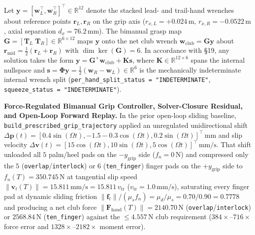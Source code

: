 \documentclass[11pt,a4paper]{article}
\begin{document}
Let $\mathbf{y} = [\mathbf{w}_L^{\top}, \mathbf{w}_R^{\top}]^{\top} \in \mathbb{R}^{12}$ denote the stacked lead- and trail-hand wrenches about reference points $\mathbf{r}_L, \mathbf{r}_R$ on the grip axis ($r_{x,L} = +0.024\,\mathrm{m}$, $r_{x,R} = -0.0522\,\mathrm{m}$, axial separation $d_x = 76.2\,\mathrm{mm}$). The bimanual grasp map $\mathbf{G} = [\mathbf{T}_L\;\mathbf{T}_R] \in \mathbb{R}^{6 \times 12}$ maps $\mathbf{y}$ onto the net club wrench $\mathbf{w}_{\mathrm{club}} = \mathbf{G}\mathbf{y}$ about $\mathbf{r}_{\mathrm{mid}} = \frac{1}{2}(\mathbf{r}_L + \mathbf{r}_R)$ with $\dim\ker(\mathbf{G}) = 6$. In accordance with \S 19, any solution takes the form $\mathbf{y} = \mathbf{G}^{+}\mathbf{w}_{\mathrm{club}} + \mathbf{K}\mathbf{s}$, where $\mathbf{K} \in \mathbb{R}^{12 \times 6}$ spans the internal nullspace and $\mathbf{s} = \boldsymbol{\Phi}\mathbf{y} = \frac{1}{2}(\mathbf{w}_R - \mathbf{w}_L) \in \mathbb{R}^6$ is the mechanically indeterminate internal wrench split (\texttt{per\_hand\_split\_status = "INDETERMINATE"}, \texttt{squeeze\_status = "INDETERMINATE"}).

\textbf{Force-Regulated Bimanual Grip Controller, Solver-Closure Residual, and Open-Loop Forward Replay.}
In the prior open-loop sliding baseline, \texttt{build\_prescribed\_grip\_trajectory} applied an unregulated unidirectional shift $\Delta \mathbf{p}(t) = [0.4\sin(\Omega t), -1.5 - 0.3\cos(\Omega t), 0.2\sin(\Omega t)]^{\top}\,\mathrm{mm}$ and slip velocity $\Delta \mathbf{v}(t) = [15\cos(\Omega t), 10\sin(\Omega t), 5\cos(\Omega t)]^{\top}\,\mathrm{mm/s}$. That shift unloaded all $5$ palm/heel pads on the $-y_{\mathrm{grip}}$ side ($f_n = 0\,\mathrm{N}$) and compressed only the $5$ (\texttt{overlap}/\texttt{interlock}) or $6$ (\texttt{ten\_finger}) finger pads on the $+y_{\mathrm{grip}}$ side to $f_n(T) = 350.745\,\mathrm{N}$ at tangential slip speed $\|\mathbf{v}_t(T)\| = 15.811\,\mathrm{mm/s} = 15.811\,v_{\mathrm{tr}}$ ($v_{\mathrm{tr}} = 1.0\,\mathrm{mm/s}$), saturating every finger pad at dynamic sliding friction $\|\mathbf{f}_t\|/(\mu_s f_n) = \mu_d/\mu_s = 0.70/0.90 = 0.7778$ and producing a net club force $\|\mathbf{F}_{\mathrm{hand}}(T)\| = 2140.70\,\mathrm{N}$ (\texttt{overlap}/\texttt{interlock}) or $2568.84\,\mathrm{N}$ (\texttt{ten\_finger}) against the $\le 4.557\,\mathrm{N}$ club requirement ($384\times$--$716\times$ force error and $1328\times$--$2182\times$ moment error).
\end{document}
